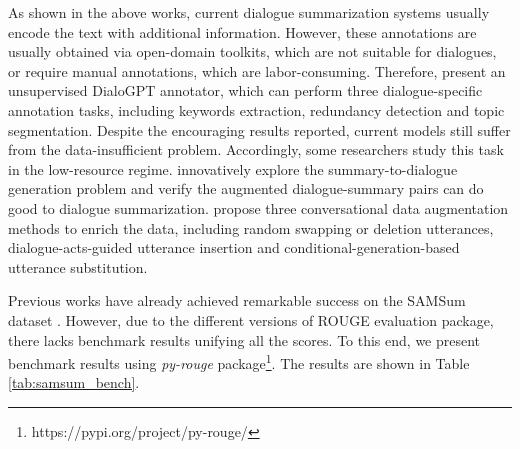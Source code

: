 As shown in the above works, current dialogue summarization systems usually encode the text with additional information.
However, these annotations are usually obtained via open-domain toolkits, which are not suitable for dialogues, or require manual annotations, which are labor-consuming.
Therefore,  present an unsupervised DialoGPT annotator, which can perform three dialogue-specific annotation tasks, including keywords extraction, redundancy detection and topic segmentation. 
Despite the encouraging results reported, current models still suffer from the data-insufficient problem. Accordingly, some researchers study this task in the low-resource regime.
 innovatively explore the summary-to-dialogue generation problem and verify the augmented dialogue-summary pairs can do good to dialogue summarization.
 propose three conversational data augmentation methods to enrich the data, including random swapping or deletion utterances, dialogue-acts-guided utterance insertion and conditional-generation-based utterance substitution.

Previous works have already achieved remarkable success on the SAMSum dataset . 
However, due to the different versions of ROUGE evaluation package, there lacks benchmark results unifying all the scores. To this end, we present benchmark results using \textit{py-rouge} package\footnote{https://pypi.org/project/py-rouge/}. The results are shown in Table \ref{tab:samsum_bench}.


